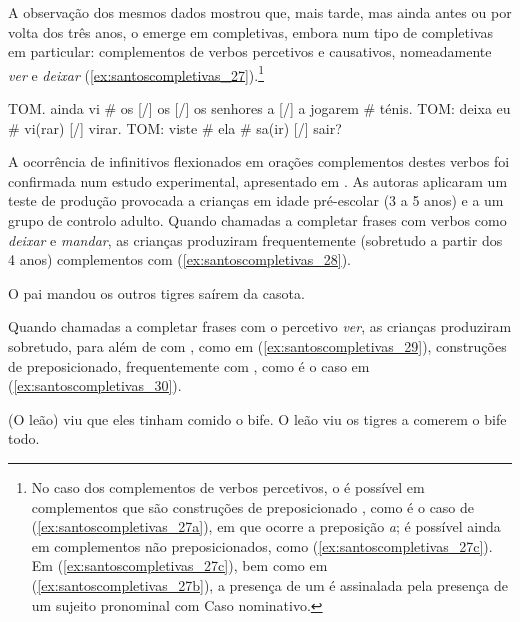 \documentclass[output=paper]{LSP/langsci}
\begin{document}
A observação dos mesmos dados mostrou que, mais tarde, mas ainda antes ou por volta dos três anos, o  emerge em completivas, embora num tipo de completivas em particular: complementos de verbos percetivos e causativos, nomeadamente \textit{ver} e \textit{deixar} (\ref{ex:santoscompletivas_27}).\footnote{No caso dos complementos de verbos percetivos, o  é possível em complementos que são construções de  preposicionado \citep{raposo1989}, como é o caso de (\ref{ex:santoscompletivas_27a}), em que ocorre a preposição \textit{a}; é possível ainda em complementos não preposicionados, como (\ref{ex:santoscompletivas_27c}). Em (\ref{ex:santoscompletivas_27c}), bem como em (\ref{ex:santoscompletivas_27b}), a presença de um  é assinalada pela presença de um sujeito pronominal com Caso nominativo.}

\ea\label{ex:santoscompletivas_27}
\ea\label{ex:santoscompletivas_27a} TOM. ainda vi \# os [/] os [/] os senhores a [/] a jogarem \# ténis.
\ex\label{ex:santoscompletivas_27b} TOM: deixa eu \# vi(rar) [/] virar.
\ex\label{ex:santoscompletivas_27c} TOM: viste \# ela \# sa(ir) [/] sair?
\zl

A ocorrência de infinitivos flexionados em orações complementos destes verbos foi confirmada num estudo experimental, apresentado em \citet{santos_etal2016}. As autoras aplicaram um teste de produção provocada a crianças em idade pré-escolar (3 a 5 anos) e a um grupo de controlo adulto. Quando chamadas a completar frases com verbos como \textit{deixar} e \textit{mandar}, as crianças produziram frequentemente (sobretudo a partir dos 4 anos) complementos com  (\ref{ex:santoscompletivas_28}).

\ea\label{ex:santoscompletivas_28} O pai mandou os outros tigres saírem da casota.
\z

Quando chamadas a completar frases com o percetivo \textit{ver}, as crianças produziram sobretudo, para além de  com , como em (\ref{ex:santoscompletivas_29}), construções de  preposicionado, frequentemente com , como é o caso em (\ref{ex:santoscompletivas_30}).

\ea\label{ex:santoscompletivas_29} (O leão) viu que eles tinham comido o bife.
\z
\ea\label{ex:santoscompletivas_30} O leão viu os tigres a comerem o bife todo.
\z
\end{document}

